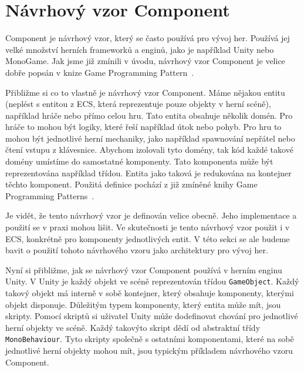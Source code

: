 \section{Návrhový vzor Component}
\label{sec:component}
Component je návrhový vzor, který se často používá pro vývoj her. Používá jej velké množství herních frameworků a enginů, jako je například Unity nebo MonoGame. Jak jsme již zmínili v úvodu, návrhový vzor Component je velice dobře popsán v knize Game Programming Pattern~\cite{nystrom2014game}.

Přibližme si co to vlastně je návrhový vzor Component. Máme nějakou entitu (neplést s entitou z ECS, která reprezentuje pouze objekty v herní scéně), například hráče nebo přímo celou hru. Tato entita obsahuje několik domén. Pro hráče to mohou být logiky, které řeší například útok nebo pohyb. Pro hru to mohou být jednotlivé herní mechaniky, jako například spawnování nepřátel nebo čtení vstupu z klávesnice. Abychom izolovali tyto domény, tak kód každé takové domény umístíme do samostatné komponenty. Tato komponenta může být reprezentována například třídou. Entita jako taková je redukována na kontejner těchto komponent. Použitá definice pochází z již zmíněné knihy Game Programming Patterns~\cite{nystrom2014game}.


Je vidět, že tento návrhový vzor je definován velice obecně. Jeho implementace a použití se v praxi mohou lišit. Ve skutečnosti je tento návrhový vzor použit i v ECS, konkrétně pro komponenty jednotlivých entit. V této sekci se ale budeme bavit o použití tohoto návrhového vzoru jako architektury pro vývoj her.

Nyní si přibližme, jak se návrhový vzor Component používá v herním enginu Unity. V Unity je každý objekt ve scéně reprezentován třídou \verb|GameObject|. Každý takový objekt má interně v sobě kontejner, který obsahuje komponenty, kterými objekt disponuje. Důležitým typem komponenty, který entita může mít, jsou skripty. Pomocí skriptů si uživatel Unity může dodefinovat chování pro jednotlivé herní objekty ve scéně. Každý takovýto skript dědí od abstraktní třídy \verb|MonoBehaviour|. Tyto skripty společně s ostatními komponentami, které na sobě jednotlivé herní objekty mohou mít, jsou typickým příkladem návrhového vzoru Component.


